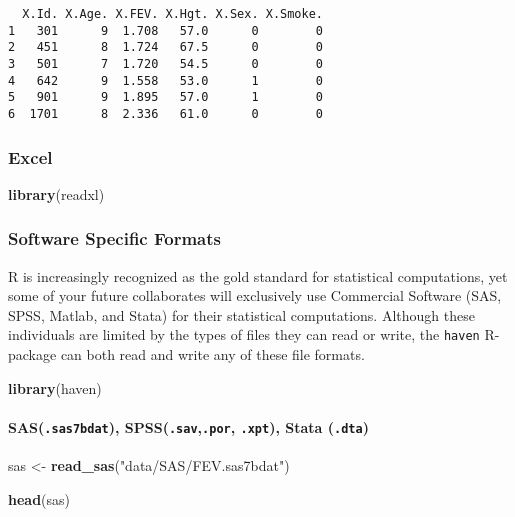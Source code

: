 \documentclass[12pt,]{article}
\newenvironment{Shaded}{\begin{snugshade}}{\end{snugshade}}
\newcommand{\KeywordTok}[1]{\textcolor[rgb]{0.13,0.29,0.53}{\textbf{#1}}}
\newcommand{\NormalTok}[1]{#1}
\newcommand{\StringTok}[1]{\textcolor[rgb]{0.31,0.60,0.02}{#1}}
\let\oldparagraph\paragraph
\renewcommand{\paragraph}[1]{\oldparagraph{#1}\mbox{}}
\begin{document}
\begin{verbatim}
  X.Id. X.Age. X.FEV. X.Hgt. X.Sex. X.Smoke.
1   301      9  1.708   57.0      0        0
2   451      8  1.724   67.5      0        0
3   501      7  1.720   54.5      0        0
4   642      9  1.558   53.0      1        0
5   901      9  1.895   57.0      1        0
6  1701      8  2.336   61.0      0        0
\end{verbatim}

\hypertarget{excel}{%
\subsubsection{Excel}\label{excel}}

\begin{Shaded}
\begin{Highlighting}[]
\KeywordTok{library}\NormalTok{(readxl)}
\end{Highlighting}
\end{Shaded}

\hypertarget{software-specific-formats}{%
\subsubsection{Software Specific
Formats}\label{software-specific-formats}}

R is increasingly recognized as the gold standard for statistical
computations, yet some of your future collaborates will exclusively use
Commercial Software (SAS, SPSS, Matlab, and Stata) for their statistical
computations. Although these individuals are limited by the types of
files they can read or write, the \texttt{haven} R-package can both read
and write any of these file formats.

\begin{Shaded}
\begin{Highlighting}[]
\KeywordTok{library}\NormalTok{(haven)}
\end{Highlighting}
\end{Shaded}

\hypertarget{sas.sas7bdat-spss.sav.por-.xpt-stata-.dta}{%
\paragraph{\texorpdfstring{SAS(\texttt{.sas7bdat}),
SPSS(\texttt{.sav},\texttt{.por}, \texttt{.xpt}), Stata
(\texttt{.dta})}{SAS(.sas7bdat), SPSS(.sav,.por, .xpt), Stata (.dta)}}\label{sas.sas7bdat-spss.sav.por-.xpt-stata-.dta}}

\begin{Shaded}
\begin{Highlighting}[]
\NormalTok{sas <-}\StringTok{ }\KeywordTok{read_sas}\NormalTok{(}\StringTok{"data/SAS/FEV.sas7bdat"}\NormalTok{)}

\KeywordTok{head}\NormalTok{(sas)}
\end{Highlighting}
\end{Shaded}
\end{document}
